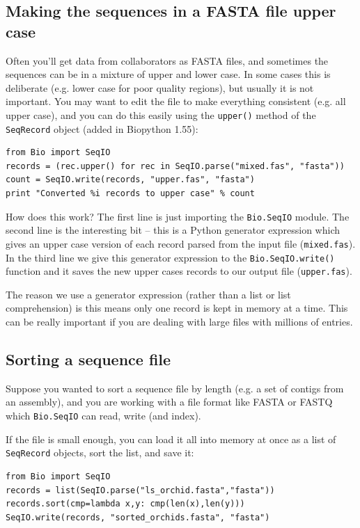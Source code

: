 \documentclass{report}
\begin{document}
\subsection{Making the sequences in a FASTA file upper case}

Often you'll get data from collaborators as FASTA files, and sometimes the
sequences can be in a mixture of upper and lower case. In some cases this is
deliberate (e.g. lower case for poor quality regions), but usually it is not
important. You may want to edit the file to make everything consistent (e.g.
all upper case), and you can do this easily using the \verb|upper()| method
of the \verb|SeqRecord| object (added in Biopython 1.55):

\begin{verbatim}
from Bio import SeqIO
records = (rec.upper() for rec in SeqIO.parse("mixed.fas", "fasta"))
count = SeqIO.write(records, "upper.fas", "fasta")
print "Converted %i records to upper case" % count
\end{verbatim}

How does this work? The first line is just importing the \verb|Bio.SeqIO|
module. The second line is the interesting bit -- this is a Python
generator expression which gives an upper case version of each record
parsed from the input file (\texttt{mixed.fas}). In the third line we give
this generator expression to the \verb|Bio.SeqIO.write()| function and it
saves the new upper cases records to our output file (\texttt{upper.fas}).

The reason we use a generator expression (rather than a list or list
comprehension) is this means only one record is kept in memory at a time.
This can be really important if you are dealing with large files with
millions of entries.

\subsection{Sorting a sequence file}
\label{sec:SeqIO-sort}

Suppose you wanted to sort a sequence file by length (e.g. a set of
contigs from an assembly), and you are working with a file format like
FASTA or FASTQ which \verb|Bio.SeqIO| can read, write (and index).

If the file is small enough, you can load it all into memory at once
as a list of \verb|SeqRecord| objects, sort the list, and save it:

\begin{verbatim}
from Bio import SeqIO
records = list(SeqIO.parse("ls_orchid.fasta","fasta"))
records.sort(cmp=lambda x,y: cmp(len(x),len(y)))
SeqIO.write(records, "sorted_orchids.fasta", "fasta")
\end{verbatim}
\end{document}
